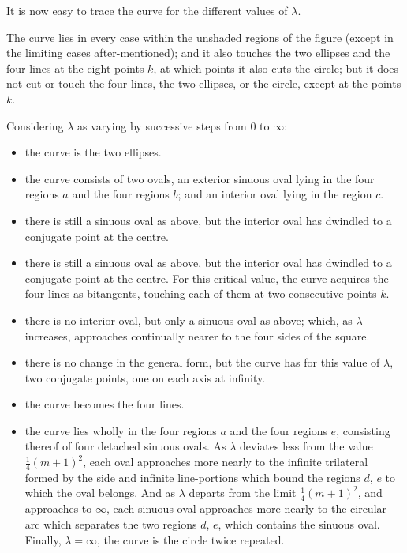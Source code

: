 \documentclass[11pt,a4paper]{article}
\theoremstyle{plain}
\begin{document}
It is now easy to trace the curve for the different values of $\lambda$.

The curve lies in every case within the unshaded regions of the figure (except in the limiting cases after-mentioned); and it also touches the two ellipses and the four lines at the eight points $k$, at which points it also cuts the circle; but it does not cut or touch the four lines, the two ellipses, or the circle, except at the points $k$.

Considering $\lambda$ as varying by successive steps from $0$ to $\infty$:

\begin{itemize}
\item[$\lambda = 0$,] the curve is the two ellipses.
\item[$\lambda < \dfrac{1}{(m+1)^2}$,] the curve consists of two ovals, an exterior sinuous oval lying in the four regions $a$ and the four regions $b$; and an interior oval lying in the region $c$.
\item[$\lambda = \dfrac{1}{(m+1)^2}$,] there is still a sinuous oval as above, but the interior oval has dwindled to a conjugate point at the centre.
\end{itemize}

\newpage
\setcounter{equation}{21}

\begin{itemize}
\item[$\lambda = \dfrac{m}{(m+1)^2}$,] there is still a sinuous oval as above, but the interior oval has dwindled to a conjugate point at the centre. For this critical value, the curve acquires the four lines as bitangents, touching each of them at two consecutive points $k$.
\item[$\dfrac{m}{(m+1)^2} < \lambda < m$,] there is no interior oval, but only a sinuous oval as above; which, as $\lambda$ increases, approaches continually nearer to the four sides of the square.
\item[$\lambda = m$,] there is no change in the general form, but the curve has for this value of $\lambda$, two conjugate points, one on each axis at infinity.
\item[$\lambda = \tfrac{1}{4}(m+1)^2$,] the curve becomes the four lines.
\item[$\lambda > \tfrac{1}{4}(m+1)^2$,] the curve lies wholly in the four regions $a$ and the four regions $e$, consisting thereof of four detached sinuous ovals. As $\lambda$ deviates less from the value $\tfrac{1}{4}(m+1)^2$, each oval approaches more nearly to the infinite trilateral formed by the side and infinite line-portions which bound the regions $d$, $e$ to which the oval belongs. And as $\lambda$ departs from the limit $\tfrac{1}{4}(m+1)^2$, and approaches to $\infty$, each sinuous oval approaches more nearly to the circular arc which separates the two regions $d$, $e$, which contains the sinuous oval. Finally, $\lambda = \infty$, the curve is the circle twice repeated.
\end{itemize}
\end{document}
